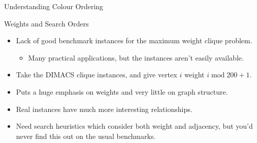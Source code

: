 \documentclass[aspectratio=169,compress,10pt]{beamer}
\begin{document}
\begin{frame}{Understanding Colour Ordering}
{\begin{tikzpicture}
    \end{tikzpicture}
    }
\end{frame}

\begin{frame}{Weights and Search Orders}
    \begin{itemize}
        \item Lack of good benchmark instances for the maximum weight clique problem.
            \begin{itemize}
                \item Many practical applications, but the instances aren't easily available.
            \end{itemize}
        \item Take the DIMACS clique instances, and give vertex $i$ weight $i \operatorname{mod} 200 + 1$.
        \item <2-> Puts a huge emphasis on weights and very little on graph structure.
        \item <2-> Real instances have much more interesting relationships.
        \item <3-> Need search heuristics which consider both weight and adjacency, but you'd never find
            this out on the usual benchmarks.
    \end{itemize}
\end{frame}
\end{document}

